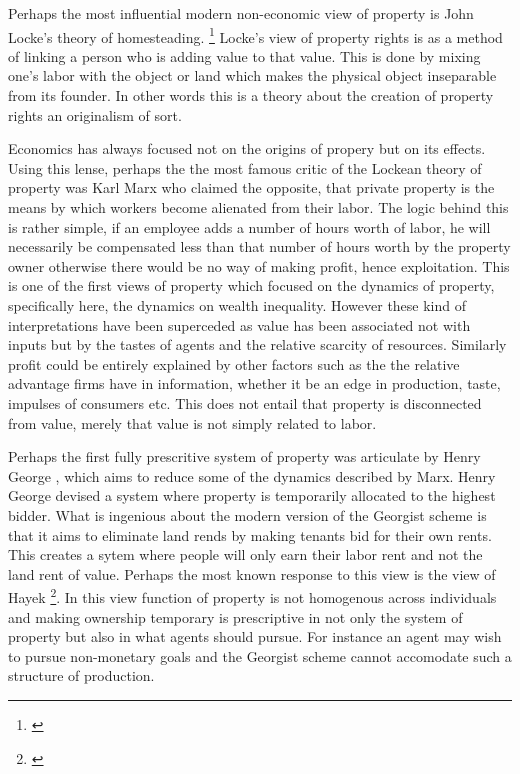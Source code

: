 \documentclass[12pt]{article}
\numberwithin{equation}{section}
\begin{document}
Perhaps the most influential modern non-economic view of property is John Locke's theory of homesteading. \footnote{\cite{locke2014second}} Locke's view of property rights is as a method of linking a person who is adding value to that value. This is done by mixing one's labor with the object or land which makes the physical object inseparable from its founder. In other words this is a theory about the creation of property rights an originalism of sort. 

Economics has always focused not on the origins of propery but on its effects. Using this lense, perhaps the the most famous critic of the Lockean theory of property was Karl Marx who claimed the opposite, that private property is the means by which workers become alienated from their labor. The logic behind this is rather simple, if an employee adds a number of hours worth of labor, he will necessarily be compensated less than that number of hours worth by the property owner otherwise there would be no way of making profit, hence exploitation. This is one of the first views of property which focused on the dynamics of property, specifically here, the dynamics on wealth inequality. However these kind of interpretations have been superceded as value has been associated not with inputs but by the tastes of agents and the relative scarcity of resources. Similarly profit could be entirely explained by other factors such as the the relative advantage firms have in information, whether it be an edge in production, taste, impulses of consumers etc. This does not entail that property is disconnected from value, merely that value is not simply related to labor. 

Perhaps the first fully prescritive system of property was articulate by Henry George \cite{progress}, which aims to reduce some of the dynamics described by Marx. Henry George devised a system where property is temporarily allocated to the highest bidder. What is ingenious about the modern version of the Georgist scheme is that it aims to eliminate land rends by making tenants bid for their own rents. This creates a sytem where people will only earn their labor rent and not the land rent of value. Perhaps the most known response to this view is the view of Hayek \footnote{\cite{Fatal}}. In this view function of property is not homogenous across individuals and making ownership temporary is prescriptive in not only the system of property but also in what agents should pursue. For instance an agent may wish to pursue non-monetary goals and the Georgist scheme cannot accomodate such a structure of production.
\end{document}

